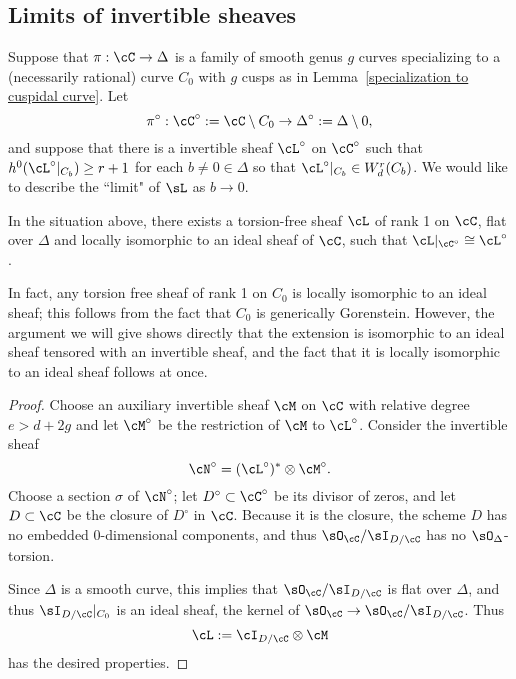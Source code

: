 \subsection{Limits of invertible sheaves}\label{invertible sheaf limits}


Suppose  that  $\pi : \cC \to \Delta$ is a family of smooth genus $g$ curves specializing to a (necessarily rational) curve $C_0$ with $g$ cusps as in Lemma~\ref{specialization to cuspidal curve}. 
 Let 
$$
\pi^\circ: \cC^\circ := \cC \setminus C_0\to \Delta^\circ := \Delta\setminus 0,
$$
and suppose that there is a invertible sheaf $\cL^\circ$ on $\cC^\circ$ such that $h^0(\cL^\circ|_{C_b}) \geq r+1$ for each $b \neq 0 \in \Delta$ so that $\cL^\circ|_{C_b}\in W^{r}_{d}(C_{b})$. We would like to describe the ``limit" of $\sL$ as $b \to 0$. 


\begin{lemma}\label{limit sheaf}
In the situation above, there exists a torsion-free sheaf $\cL$ of rank 1 on $\cC$, flat over $\Delta$ and locally isomorphic to
an ideal sheaf of $\cC$, such that $\cL|_{\cC^\circ} \cong \cL^\circ$.
\end{lemma}

In fact, any torsion free sheaf of rank 1 on $C_{0}$ is locally isomorphic
to an ideal sheaf; this follows from the fact that $C_{0}$ is generically Gorenstein. However, the argument we will give 
shows directly that the extension is isomorphic to an ideal sheaf tensored with an invertible sheaf, and the fact that
it is locally isomorphic to an ideal sheaf follows at once.

\begin{proof} Choose an auxiliary invertible sheaf $\cM$ on $\cC$ with relative degree $e > d + 2g$ and let $\cM^\circ$ be the restriction of $\cM$ to $\cL^\circ$. Consider the invertible sheaf 
$$
\cN^\circ = (\cL^\circ)^* \otimes \cM^\circ.
$$
Choose a section $\sigma$ of $\cN^\circ$; let $D^\circ \subset \cC^\circ$ be its divisor of zeros, and let $D \subset \cC$ be the closure of $D^\circ$ in $\cC$. Because it is the closure, the scheme $D$ has no embedded 
0-dimensional components, and thus $\sO_{\cC}/\sI_{D/\cC}$ has no $\sO_{\Delta}$-torsion. 

Since $\Delta$ is a smooth
curve, this implies that $\sO_{\cC}/\sI_{D/\cC}$ is flat over $\Delta$, and thus $\sI_{D/\cC}|_{C_{0}}$
is an ideal sheaf, the kernel of $\sO_{\cC} \to \sO_{\cC}/\sI_{D/\cC}$. Thus
$$
\cL := \cI_{D/\cC} \otimes \cM
$$
has the desired properties. 
\end{proof}

